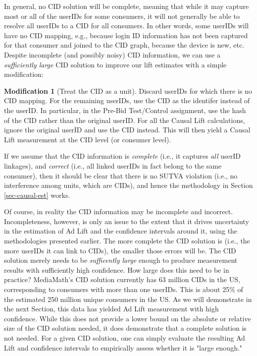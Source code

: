 \documentclass[11pt,a4paper]{article}
\theoremstyle{definition}
\theoremstyle{remark}
\theoremstyle{definition}
\theoremstyle{definition}
\theoremstyle{definition}
\theoremstyle{definition}
\theoremstyle{definition}
\newtheorem{modification}{Modification}[section]
\theoremstyle{definition}
\begin{document}
In general, no CID solution will be complete, meaning that while it may capture most or all of the userIDs for some consumers, it will not generally be able to resolve all userIDs to a CID for all consumers. In other words, some userIDs will have no CID mapping, e.g., because login ID information has not been captured for that consumer and joined to the CID graph, because the device is new, etc. Despite incomplete (and possibly noisy) CID information, we can use a {\em sufficiently large} CID solution to improve our lift estimates with a simple modification: 

\begin{modification}[Treat the CID as a unit]
Discard userIDs for which there is no CID mapping. For the remaining userIDs, use the CID as the identifer instead of the userID. In particular, in the Pre-Bid Test/Control assignment, use the hash of the CID rather than the original userID. For all the Causal Lift calculations, ignore the original userID and use the CID instead. This will then yield a Causal Lift measurement at the CID level (or consumer level).
\end{modification}

If we assume that the CID information is \textit{complete} (i.e., it captures \textit{all} userID linkages), and \textit{correct} (i.e., all linked userIDs in fact belong to the same consumer), then it should be clear that there is no SUTVA violation (i.e., no interference among units, which are CIDs), and hence the methodology in Section \ref{sec-causal-est} works. 

Of course, in reality the CID information may be incomplete and incorrect. Incompleteness, however, is only an issue to the extent that it drives uncertainty in the estimation of Ad Lift and the confidence intervals around it, using the methodologies presented earlier. The more complete the CID solution is (i.e., the more userIDs it can link to CIDs), the smaller those errors will be. The CID solution merely needs to be {\em sufficently large} enough to produce measurement results with sufficiently high confidence. How large does this need to be in practice? MediaMath's CID solution currently has 63 million CIDs in the US, corresponding to consumers with more than one userIDs. This is about 25\% of the estimated 250 million unique consumers in the US. As we will demonstrate in the next Section, this data has yielded Ad Lift measurement with high confidence. While this does not provide a lower bound on the absolute or relative size of the CID solution needed, it does demonstrate that a complete solution is not needed. For a given CID solution, one can simply evaluate the resulting Ad Lift and confidence intervals to empirically assess whether it is "large enough."
\end{document}
